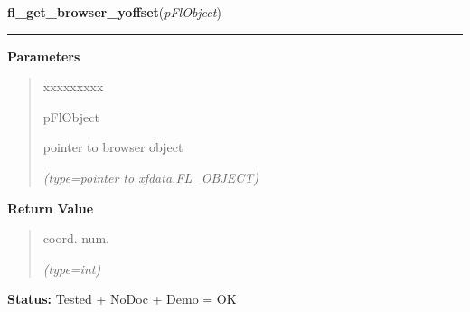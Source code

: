 \hspace{.8\funcindent}\begin{boxedminipage}{\funcwidth}

    \raggedright \textbf{fl\_get\_browser\_yoffset}(\textit{pFlObject})

    \vspace{-1.5ex}

    \rule{\textwidth}{0.5\fboxrule}
\setlength{\parskip}{2ex}
\setlength{\parskip}{1ex}
      \textbf{Parameters}
      \vspace{-1ex}

      \begin{quote}
        \begin{Ventry}{xxxxxxxxx}

          \item[pFlObject]

          pointer to browser object

            {\it (type=pointer to xfdata.FL\_OBJECT)}

        \end{Ventry}

      \end{quote}

      \textbf{Return Value}
    \vspace{-1ex}

      \begin{quote}
      coord. num.

      {\it (type=int)}

      \end{quote}

\textbf{Status:} Tested + NoDoc + Demo = OK



    \end{boxedminipage}

    \label{xformslib:flbrowser:fl_get_browser_rel_yoffset}

    \vspace{0.5ex}

